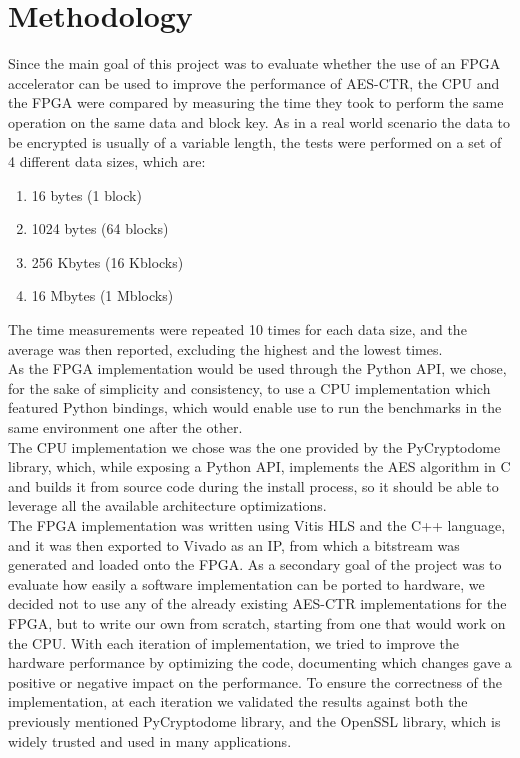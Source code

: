 \documentclass[12pt,oneside,a4paper]{article}
\begin{document}
\section{Methodology} \label{sec:methodology}
Since the main goal of this project was to evaluate whether the use of an FPGA accelerator can be used to improve the performance of AES-CTR, the CPU and the FPGA were compared by measuring the time they took to perform the same operation on the same data and block key.
As in a real world scenario the data to be encrypted is usually of a variable length, the tests were performed on a set of 4 different data sizes, which are:
\begin{enumerate}
	\item 16 bytes (1 block)
	\item 1024 bytes (64 blocks)
	\item 256 Kbytes (16 Kblocks)
	\item 16 Mbytes (1 Mblocks)
\end{enumerate}
The time measurements were repeated 10 times for each data size, and the average was then reported, excluding the highest and the lowest times.
\\As the FPGA implementation would be used through the Python API, we chose, for the sake of simplicity and consistency, to use a CPU implementation which featured Python bindings, which would enable use to run the benchmarks in the same environment one after the other.
\\The CPU implementation we chose was the one provided by the PyCryptodome library, which, while exposing a Python API, implements the AES algorithm in C and builds it from source code during the install process, so it should be able to leverage all the available architecture optimizations.
\\The FPGA implementation was written using Vitis HLS and the C++ language, and it was then exported to Vivado as an IP, from which a bitstream was generated and loaded onto the FPGA.
As a secondary goal of the project was to evaluate how easily a software implementation can be ported to hardware, we decided not to use any of the already existing AES-CTR implementations for the FPGA, but to write our own from scratch, starting from one that would work on the CPU.
With each iteration of implementation, we tried to improve the hardware performance by optimizing the code, documenting which changes gave a positive or negative impact on the performance.
To ensure the correctness of the implementation, at each iteration we validated the results against both the previously mentioned PyCryptodome library, and the OpenSSL library, which is widely trusted and used in many applications.
\end{document}
